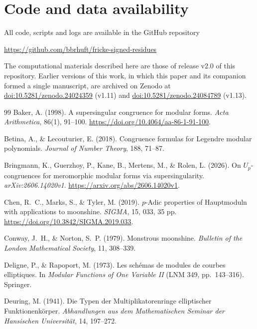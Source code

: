 \documentclass[11pt,a4paper]{article}
\numberwithin{equation}{section}
\theoremstyle{definition}
\theoremstyle{remark}
\begin{document}
\section*{Code and data availability}
All code, scripts and logs are available in the GitHub repository
\begin{center}\url{https://github.com/bbrhuft/fricke-signed-residues}\end{center}
The computational materials described here are those of release v2.0 of this repository.
Earlier versions of this work, in which this paper and its companion formed a single
manuscript, are archived on Zenodo at
\href{https://doi.org/10.5281/zenodo.24024359}{doi:10.5281/zenodo.24024359} (v1.11) and
\href{https://doi.org/10.5281/zenodo.24084789}{doi:10.5281/zenodo.24084789} (v1.13).

\begin{thebibliography}{99}\small
{} Baker, A. (1998). A supersingular congruence for modular forms.
\emph{Acta Arithmetica}, 86(1), 91--100. \url{https://doi.org/10.4064/aa-86-1-91-100}.


 Betina, A., \& Lecouturier, E. (2018). Congruence formulas for
Legendre modular polynomials. \emph{Journal of Number Theory}, 188, 71--87.


 Bringmann, K., Guerzhoy, P.,
Kane, B., Mertens, M., \& Rolen, L. (2026). On $U_p$-congruences for
meromorphic modular forms via supersingularity. \emph{arXiv:2606.14020v1}.
\url{https://arxiv.org/abs/2606.14020v1}.


 Chen, R.~C., Marks, S., \& Tyler, M. (2019).
$p$-Adic properties of Hauptmoduln with applications to moonshine.
\emph{SIGMA}, 15, 033, 35 pp. \url{https://doi.org/10.3842/SIGMA.2019.033}.


 Conway, J.~H., \& Norton, S.~P. (1979). Monstrous moonshine.
\emph{Bulletin of the London Mathematical Society}, 11, 308--339.


 Deligne, P., \& Rapoport, M. (1973). Les sch\'emas de modules de
courbes elliptiques. In \emph{Modular Functions of One Variable II} (LNM 349, pp.~143--316). Springer.


 Deuring, M. (1941). Die Typen der Multiplikatorenringe elliptischer Funktionenk\"orper. \emph{Abhandlungen aus dem Mathematischen Seminar der Hansischen Universit\"at}, 14, 197--272.



\end{thebibliography}
\end{document}
